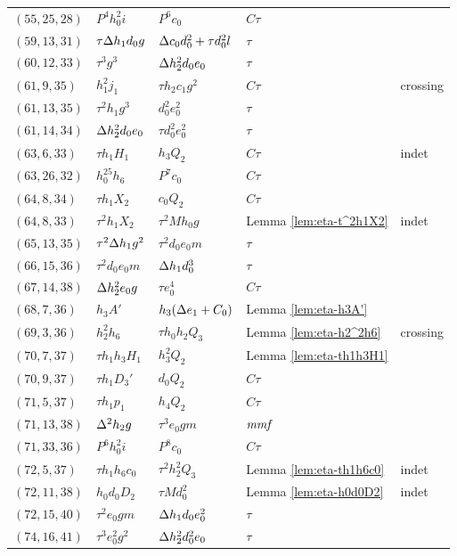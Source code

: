 \begin{longtable}{lllll}
$(55, 25, 28)$ & $P^4 h_0^2 i$ & $P^6 c_0$ & $C\tau$ \\
$(59, 13, 31)$ & $\tau \Delta h_1 d_0 g$ & $\Delta c_0 d_0^2 + \tau d_0^2 l$ & $\tau$ \\
$(60, 12, 33)$ & $\tau^3 g^3$ & $\Delta h_2^2 d_0 e_0$ & $\tau$ \\
$(61, 9, 35)$ & $h_1^2 j_1$ & $\tau h_2 c_1 g^2$ & $C\tau$ 
	& crossing \\
$(61, 13, 35)$ & $\tau^2 h_1 g^3$ & $d_0^2 e_0^2$ & $\tau$ \\
$(61, 14, 34)$ & $\Delta h_2^2 d_0 e_0$ & $\tau d_0^2 e_0^2$ & $\tau$ \\
$(63, 6, 33)$ & $\tau h_1 H_1$ & $h_3 Q_2$ & $C\tau$ & indet \\
$(63, 26, 32)$ & $h_0^{25} h_6$ & $P^7 c_0$ & $C\tau$ \\
$(64, 8, 34)$ & $\tau h_1 X_2$ & $c_0 Q_2$ & $C\tau$ \\
$(64, 8, 33)$ & $\tau^2 h_1 X_2$ & $\tau^2 M h_0 g$ & Lemma \ref{lem:eta-t^2h1X2} & indet \\
$(65, 13, 35)$ & $\tau^2 \Delta h_1 g^2$ & $\tau^2 d_0 e_0 m$ & $\tau$ \\
$(66, 15, 36)$ & $\tau^2 d_0 e_0 m$ & $\Delta h_1 d_0^3$ & $\tau$ \\
$(67, 14, 38)$ & $\Delta h_2^2 e_0 g$ & $\tau e_0^4$ & $C\tau$ \\
$(68, 7, 36)$ & $h_3 A'$ & $h_3 (\Delta e_1 + C_0)$ & Lemma \ref{lem:eta-h3A'} \\
$(69, 3, 36)$ & $h_2^2 h_6$ & $\tau h_0 h_2 Q_3$ & Lemma \ref{lem:eta-h2^2h6} & crossing \\
$(70,7,37)$ & $\tau h_1 h_3 H_1$ & $h_3^2 Q_2$ & Lemma \ref{lem:eta-th1h3H1} & \\ 
$(70,9,37)$ & $\tau h_1 D_3'$ & $d_0 Q_2$ & $C\tau$ \\
$(71,5,37)$ & $\tau h_1 p_1$ & $h_4 Q_2$ & $C\tau$ \\
$(71,13,38)$ & $\Delta^2 h_2 g$ & $\tau^3 e_0 g m$ & $\textit{mmf}$ \\
$(71,33,36)$ & $P^6 h_0^2 i$ & $P^8 c_0$ & $C\tau$ \\
$(72,5,37)$ & $\tau h_1 h_6 c_0$ & $\tau^2 h_2^2 Q_3$ & Lemma \ref{lem:eta-th1h6c0} & indet \\
$(72,11,38)$ & $h_0 d_0 D_2$ & $\tau M d_0^2$ & Lemma \ref{lem:eta-h0d0D2} & indet \\
$(72,15,40)$ & $\tau^2 e_0 g m$ & $\Delta h_1 d_0 e_0^2$ & $\tau$ \\
$(74,16,41)$ & $\tau^3 e_0^2 g^2$ & $\Delta h_2^2 d_0^2 e_0$ & $\tau$ \\

\end{longtable}
